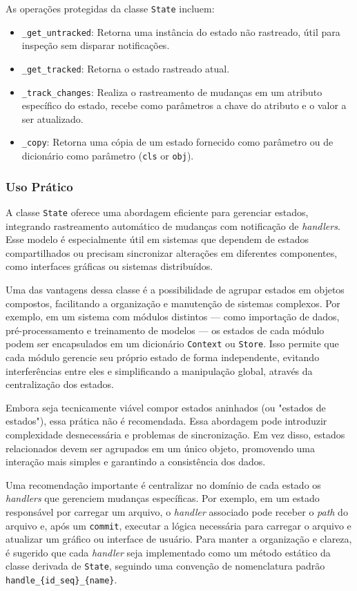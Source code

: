 As operações protegidas da classe \texttt{State} incluem:

\begin{itemize}
    \item \texttt{\_get\_untracked}: Retorna uma instância do estado não rastreado, útil para inspeção sem disparar notificações.
    \item \texttt{\_get\_tracked}: Retorna o estado rastreado atual.
    \item \texttt{\_track\_changes}: Realiza o rastreamento de mudanças em um atributo específico do estado, recebe como parâmetros a chave do atributo e o valor a ser atualizado.
    \item \texttt{\_copy}: Retorna uma cópia de um estado fornecido como parâmetro ou de dicionário como parâmetro (\texttt{cls} or \texttt{obj}).
\end{itemize}

\subsubsection{Uso Prático}

A classe \texttt{State} oferece uma abordagem eficiente para gerenciar estados, integrando rastreamento automático de mudanças com notificação de \textit{handlers}. Esse modelo é especialmente útil em sistemas que dependem de estados compartilhados ou precisam sincronizar alterações em diferentes componentes, como interfaces gráficas ou sistemas distribuídos.

Uma das vantagens dessa classe é a possibilidade de agrupar estados em objetos compostos, facilitando a organização e manutenção de sistemas complexos. Por exemplo, em um sistema com módulos distintos — como importação de dados, pré-processamento e treinamento de modelos — os estados de cada módulo podem ser encapsulados em um dicionário \texttt{Context} ou \texttt{Store}. Isso permite que cada módulo gerencie seu próprio estado de forma independente, evitando interferências entre eles e simplificando a manipulação global, através da centralização dos estados.

Embora seja tecnicamente viável compor estados aninhados (ou "estados de estados"), essa prática não é recomendada. Essa abordagem pode introduzir complexidade desnecessária e problemas de sincronização. Em vez disso, estados relacionados devem ser agrupados em um único objeto, promovendo uma interação mais simples e garantindo a consistência dos dados.

Uma recomendação importante é centralizar no domínio de cada estado os \textit{handlers} que gerenciem mudanças específicas. Por exemplo, em um estado responsável por carregar um arquivo, o \textit{handler} associado pode receber o \textit{path} do arquivo e, após um \texttt{commit}, executar a lógica necessária para carregar o arquivo e atualizar um gráfico ou interface de usuário. Para manter a organização e clareza, é sugerido que cada \textit{handler} seja implementado como um método estático da classe derivada de \texttt{State}, seguindo uma convenção de nomenclatura padrão \verb|handle_{id_seq}_{name}|.

